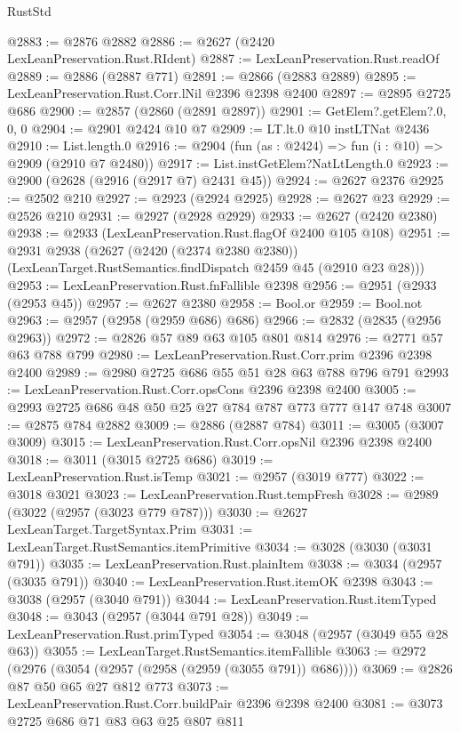 \begin{lexlean}{RustStd}
\begin{coremodule}
@2883 := @2876 @2882
@2886 := @2627 (@2420 LexLeanPreservation.Rust.RIdent)
@2887 := LexLeanPreservation.Rust.readOf
@2889 := @2886 (@2887 @771)
@2891 := @2866 (@2883 @2889)
@2895 := LexLeanPreservation.Rust.Corr.lNil @2396 @2398 @2400
@2897 := @2895 @2725 @686
@2900 := @2857 (@2860 (@2891 @2897))
@2901 := GetElem?.getElem?.{0, 0, 0}
@2904 := @2901 @2424 @10 @7
@2909 := LT.lt.{0} @10 instLTNat @2436
@2910 := List.length.{0}
@2916 := @2904 (fun (as : @2424) => fun (i : @10) => @2909 (@2910 @7 @2480))
@2917 := List.instGetElem?NatLtLength.{0}
@2923 := @2900 (@2628 (@2916 (@2917 @7) @2431 @45))
@2924 := @2627 @2376
@2925 := @2502 @210
@2927 := @2923 (@2924 @2925)
@2928 := @2627 @23
@2929 := @2526 @210
@2931 := @2927 (@2928 @2929)
@2933 := @2627 (@2420 @2380)
@2938 := @2933 (LexLeanPreservation.Rust.flagOf @2400 @105 @108)
@2951 := @2931
    @2938
    (@2627
      (@2420 (@2374 @2380 @2380))
      (LexLeanTarget.RustSemantics.findDispatch @2459 @45 (@2910 @23 @28)))
@2953 := LexLeanPreservation.Rust.fnFallible @2398
@2956 := @2951 (@2933 (@2953 @45))
@2957 := @2627 @2380
@2958 := Bool.or
@2959 := Bool.not
@2963 := @2957 (@2958 (@2959 @686) @686)
@2966 := @2832 (@2835 (@2956 @2963))
@2972 := @2826 @57 @89 @63 @105 @801 @814
@2976 := @2771 @57 @63 @788 @799
@2980 := LexLeanPreservation.Rust.Corr.prim @2396 @2398 @2400
@2989 := @2980 @2725 @686 @55 @51 @28 @63 @788 @796 @791
@2993 := LexLeanPreservation.Rust.Corr.opsCons @2396 @2398 @2400
@3005 := @2993 @2725 @686 @48 @50 @25 @27 @784 @787 @773 @777 @147 @748
@3007 := @2875 @784 @2882
@3009 := @2886 (@2887 @784)
@3011 := @3005 (@3007 @3009)
@3015 := LexLeanPreservation.Rust.Corr.opsNil @2396 @2398 @2400
@3018 := @3011 (@3015 @2725 @686)
@3019 := LexLeanPreservation.Rust.isTemp
@3021 := @2957 (@3019 @777)
@3022 := @3018 @3021
@3023 := LexLeanPreservation.Rust.tempFresh
@3028 := @2989 (@3022 (@2957 (@3023 @779 @787)))
@3030 := @2627 LexLeanTarget.TargetSyntax.Prim
@3031 := LexLeanTarget.RustSemantics.itemPrimitive
@3034 := @3028 (@3030 (@3031 @791))
@3035 := LexLeanPreservation.Rust.plainItem
@3038 := @3034 (@2957 (@3035 @791))
@3040 := LexLeanPreservation.Rust.itemOK @2398
@3043 := @3038 (@2957 (@3040 @791))
@3044 := LexLeanPreservation.Rust.itemTyped
@3048 := @3043 (@2957 (@3044 @791 @28))
@3049 := LexLeanPreservation.Rust.primTyped
@3054 := @3048 (@2957 (@3049 @55 @28 @63))
@3055 := LexLeanTarget.RustSemantics.itemFallible
@3063 := @2972 (@2976 (@3054 (@2957 (@2958 (@2959 (@3055 @791)) @686))))
@3069 := @2826 @87 @50 @65 @27 @812 @773
@3073 := LexLeanPreservation.Rust.Corr.buildPair @2396 @2398 @2400
@3081 := @3073 @2725 @686 @71 @83 @63 @25 @807 @811

\end{coremodule}
\end{lexlean}

